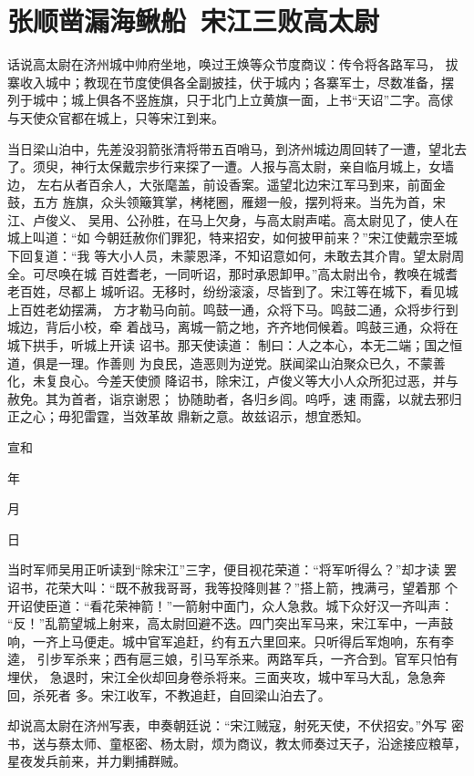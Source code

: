 \chapter{张顺凿漏海鳅船~宋江三败高太尉}

话说高太尉在济州城中帅府坐地，唤过王焕等众节度商议：传令将各路军马，
拔寨收入城中；教现在节度使俱各全副披挂，伏于城内；各寨军士，尽数准备，摆
列于城中；城上俱各不竖旌旗，只于北门上立黄旗一面，上书“天诏”二字。高俅
与天使众官都在城上，只等宋江到来。

当日梁山泊中，先差没羽箭张清将带五百哨马，到济州城边周回转了一遭，望北去
了。须臾，神行太保戴宗步行来探了一遭。人报与高太尉，亲自临月城上，女墙边，
左右从者百余人，大张麾盖，前设香案。遥望北边宋江军马到来，前面金鼓，五方
旌旗，众头领簸箕掌，栲栳圈，雁翅一般，摆列将来。当先为首，宋江、卢俊义、
吴用、公孙胜，在马上欠身，与高太尉声喏。高太尉见了，使人在城上叫道：“如
今朝廷赦你们罪犯，特来招安，如何披甲前来？”宋江使戴宗至城下回复道：“我
等大小人员，未蒙恩泽，不知诏意如何，未敢去其介胄。望太尉周全。可尽唤在城
百姓耆老，一同听诏，那时承恩卸甲。”高太尉出令，教唤在城耆老百姓，尽都上
城听诏。无移时，纷纷滚滚，尽皆到了。宋江等在城下，看见城上百姓老幼摆满，
方才勒马向前。鸣鼓一通，众将下马。鸣鼓二通，众将步行到城边，背后小校，牵
着战马，离城一箭之地，齐齐地伺候着。鸣鼓三通，众将在城下拱手，听城上开读
诏书。那天使读道：
制曰：人之本心，本无二端；国之恒道，俱是一理。作善则
为良民，造恶则为逆党。朕闻梁山泊聚众已久，不蒙善化，未复良心。今差天使颁
降诏书，除宋江，卢俊义等大小人众所犯过恶，并与赦免。其为首者，诣京谢恩；
协随助者，各归乡闾。呜呼，速雨露，以就去邪归正之心；毋犯雷霆，当效革故
鼎新之意。故兹诏示，想宜悉知。

宣和

年

月

日

当时军师吴用正听读到“除宋江”三字，便目视花荣道：“将军听得么？”却才读
罢诏书，花荣大叫：“既不赦我哥哥，我等投降则甚？”搭上箭，拽满弓，望着那
个开诏使臣道：“看花荣神箭！”一箭射中面门，众人急救。城下众好汉一齐叫声：
“反！”乱箭望城上射来，高太尉回避不迭。四门突出军马来，宋江军中，一声鼓
响，一齐上马便走。城中官军追赶，约有五六里回来。只听得后军炮响，东有李逵，
引步军杀来；西有扈三娘，引马军杀来。两路军兵，一齐合到。官军只怕有埋伏，
急退时，宋江全伙却回身卷杀将来。三面夹攻，城中军马大乱，急急奔回，杀死者
多。宋江收军，不教追赶，自回梁山泊去了。

却说高太尉在济州写表，申奏朝廷说：“宋江贼寇，射死天使，不伏招安。”外写
密书，送与蔡太师、童枢密、杨太尉，烦为商议，教太师奏过天子，沿途接应粮草，
星夜发兵前来，并力剿捕群贼。

